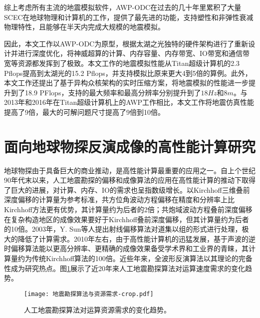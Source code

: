 综上考虑所有主流的地震模拟软件，AWP-ODC在过去的几十年里累积了大量SCEC在地球物理和计算机的工作，提供了最先进的功能，支持塑性和非弹性衰减物理特性，且能够在半天内完成大规模的地震模拟。

因此，本文工作以AWP-ODC为原型，根据太湖之光独特的硬件架构进行了重新设计并进行深度优化，将神威超算的计算、内存容量、内存带宽、IO带宽和通信带宽等资源都发挥到了极致。本文工作的地震模拟性能从Titan超级计算机的2.3 Pflops提高到太湖光的15.2 Pflops，并支持模拟比原来更大4到5倍的算例。此外，本文工作还提出了基于异构众核架构的实时压缩方案，将地震模拟的性能进一步提升到了18.9 PFlops，支持的最大频率和最高分辨率分别提升到了$18Hz$和$8m$。与2013年和2016年在Titan超级计算机上的AWP工作相比，本文工作将地震仿真性能提高了9倍，最大的可解问题尺寸提高了9倍到10倍。



\section{面向地球物探反演成像的高性能计算研究}


地球物探由于具备巨大的商业推动，是高性能计算最重要的应用之一。自上个世纪90年代末以来，人工地震勘探的偏移和成像算法的应用在高性能计算的推动下取得了巨大的进展，对计算、内存、IO的需求也呈指数级增长。以Kirchhoff三维叠前深度偏移\cite{yilmaz2001seismic}的计算量为参考标准，共方位角波动方程偏移\cite{rickett2002offset}在精度和分辨率上比Kirchhoff方法更有优势，其计算量约为后者的2倍；共炮域波动方程叠前深度偏移\cite{zhang2005theory}在复杂构造地区的成像效果要好于Kirchhoff叠前深度偏移，但其计算量约为后者的10倍。2003年，Y. Sun等人提出射线偏移算法\cite{sun20003}对道集以组的形式进行处理，极大的降低了计算需求。2010年左右，由于高性能计算机的迅猛发展，基于声波的逆时偏移算法\cite{baysal1983reverse}能以更高分辨率、更精确的成像效果备受学术界和工业界的青睐，其计算量约为传统Kirchhoff算法的100倍。近些年来，全波形反演算法\cite{tarantola1984inversion}以其理论的完备性成为研究热点。图\ref{fig:seismicmethod}展示了近20年来人工地震勘探算法对运算速度需求的变化趋势。

\begin{figure}[ht]
\centering
\texttt{[image: 地震勘探算法与资源需求-crop.pdf]}
\caption{人工地震勘探算法对运算资源需求的变化趋势。}
\label{fig:seismicmethod}
\end{figure}

